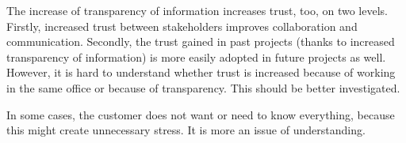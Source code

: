 %
% 
%
%
%

 The increase of transparency of information increases trust, too, on two levels. Firstly, increased trust between stakeholders improves collaboration and communication. Secondly, the trust gained in past projects (thanks to increased transparency of information) is more easily adopted in future projects as well. However, it is hard to understand whether trust is increased because of working in the same office or because of transparency. This should be better investigated. %

 In some cases, the customer does not want or need to know everything, because this might create unnecessary stress. It is more an issue of understanding. %

